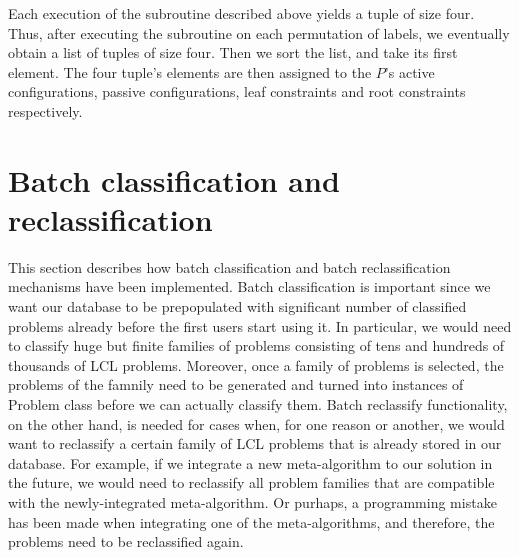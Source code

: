 Each execution of the subroutine described above yields a tuple
of size four. Thus, after executing the subroutine on each permutation of
labels, we eventually obtain a list of tuples of size four.
Then we sort the list, and take its first element. The four
tuple's elements are then assigned to the $P$'s
active configurations, passive configurations, leaf
constraints and root constraints respectively.





  
  


\section{Batch classification and reclassification}

This section describes how batch classification and
batch reclassification mechanisms have been implemented.
Batch classification is important since we want our database
to be prepopulated with significant number of classified
problems already before the first users start using it.
In particular, we would need to classify huge but finite
families of problems consisting of tens and hundreds of
thousands of LCL problems. Moreover, once a family of
problems is selected, the problems of the famnily need to
be generated and turned into instances of Problem class before
we can actually classify them. Batch reclassify functionality,
on the other hand, is needed for cases when, for one reason
or another, we would want to reclassify a certain
family of LCL problems that is already stored in our
database. For example, if we integrate a new meta-algorithm
to our solution in the future, we would need to reclassify
all problem families that are compatible with the newly-integrated
meta-algorithm. Or purhaps, a programming mistake has been
made when integrating one of the meta-algorithms, and therefore,
the problems need to be reclassified again.

